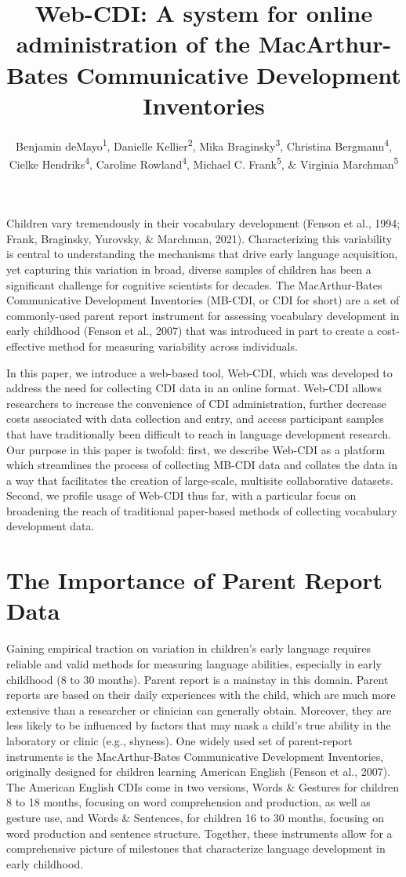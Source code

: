 \documentclass[
  english,
  ,man,floatsintext]{apa6}
\title{Web-CDI: A system for online administration of the MacArthur-Bates Communicative Development Inventories}
\author{Benjamin deMayo\textsuperscript{1}, Danielle Kellier\textsuperscript{2}, Mika Braginsky\textsuperscript{3}, Christina Bergmann\textsuperscript{4}, Cielke Hendriks\textsuperscript{4}, Caroline Rowland\textsuperscript{4}, Michael C. Frank\textsuperscript{5}, \& Virginia Marchman\textsuperscript{5}}
\date{}
\affiliation{\vspace{0.5cm}\textsuperscript{1} Princeton University\\\textsuperscript{2} University of Pennsylvania\\\textsuperscript{3} Massachussetts Institute of Technology\\\textsuperscript{4} Max Planck Institute for Psycholinguistics\\\textsuperscript{5} Stanford University}
\begin{document}
\maketitle

Children vary tremendously in their vocabulary development (Fenson et al., 1994; Frank, Braginsky, Yurovsky, \& Marchman, 2021). Characterizing this variability is central to understanding the mechanisms that drive early language acquisition, yet capturing this variation in broad, diverse samples of children has been a significant challenge for cognitive scientists for decades. The MacArthur-Bates Communicative Development Inventories (MB-CDI, or CDI for short) are a set of commonly-used parent report instrument for assessing vocabulary development in early childhood (Fenson et al., 2007) that was introduced in part to create a cost-effective method for measuring variability across individuals.

In this paper, we introduce a web-based tool, Web-CDI, which was developed to address the need for collecting CDI data in an online format. Web-CDI allows researchers to increase the convenience of CDI administration, further decrease costs associated with data collection and entry, and access participant samples that have traditionally been difficult to reach in language development research. Our purpose in this paper is twofold: first, we describe Web-CDI as a platform which streamlines the process of collecting MB-CDI data and collates the data in a way that facilitates the creation of large-scale, multisite collaborative datasets. Second, we profile usage of Web-CDI thus far, with a particular focus on broadening the reach of traditional paper-based methods of collecting vocabulary development data.

\hypertarget{the-importance-of-parent-report-data}{%
\section{The Importance of Parent Report Data}\label{the-importance-of-parent-report-data}}

Gaining empirical traction on variation in children's early language requires reliable and valid methods for measuring language abilities, especially in early childhood (8 to 30 months). Parent report is a mainstay in this domain. Parent reports are based on their daily experiences with the child, which are much more extensive than a researcher or clinician can generally obtain. Moreover, they are less likely to be influenced by factors that may mask a child's true ability in the laboratory or clinic (e.g., shyness). One widely used set of parent-report instruments is the MacArthur-Bates Communicative Development Inventories, originally designed for children learning American English (Fenson et al., 2007). The American English CDIs come in two versions, Words \& Gestures for children 8 to 18 months, focusing on word comprehension and production, as well as gesture use, and Words \& Sentences, for children 16 to 30 months, focusing on word production and sentence structure. Together, these instruments allow for a comprehensive picture of milestones that characterize language development in early childhood.
\end{document}

